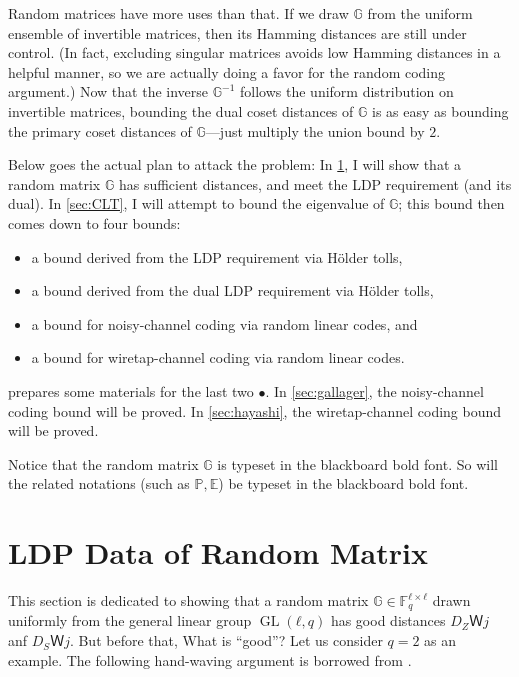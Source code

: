 \documentclass[openany]{amsbook}
\numberwithin{equation}{chapter}
\numberwithin{figure}{chapter}
\numberwithin{table}{chapter}
\DeclareMathOperator\GL{GL}
\theoremstyle{definition}	理dfn:Definition~?s			理exa:Example~?s
\theoremstyle{remark}		理cla:Claim~?s				理rem:Remark~?s
\begin{document}
	Random matrices have more uses than that.
	If we draw $𝔾$ from the uniform ensemble of invertible matrices,
	then its Hamming distances are still under control.
	(In fact, excluding singular matrices avoids low Hamming distances
	in a helpful manner, so we are actually doing a favor
	for the random coding argument.)
	Now that the inverse $𝔾^{-1}$ follows the uniform distribution on
	invertible matrices, bounding the dual coset distances of $𝔾$ is as easy as
	bounding the primary coset distances of $𝔾$---just multiply the union bound by $2$.
	
	Below goes the actual plan to attack the problem:
	In \cref{sec:LDP}, I will show that a random matrix $𝔾$ has sufficient distances,
	and meet the LDP requirement (and its dual).
	In \cref{sec:CLT}, I will attempt to bound the eigenvalue of $𝔾$;
	this bound then comes down to four bounds:
	\begin{itemize}
		\item	a bound derived from the LDP requirement via Hölder tolls,
		\item	a bound derived from the dual LDP requirement via Hölder tolls,
		\item	a bound for noisy-channel coding via random linear codes, and
		\item	a bound for wiretap-channel coding via random linear codes.
	\end{itemize}
	 prepares some materials for the last two $•$.
	In \cref{sec:gallager}, the noisy-channel coding bound will be proved.
	In \cref{sec:hayashi}, the wiretap-channel coding bound will be proved.
	
	Notice that the random matrix $𝔾$ is typeset in the blackboard bold font.
	So will the related notations (such as $ℙ,𝔼$)
	be typeset in the blackboard bold font.

\section{LDP Data of Random Matrix}\label{sec:LDP}

	This section is dedicated to showing that a random matrix $𝔾∈𝔽_q^{ℓ×ℓ}$
	drawn uniformly from the general linear group $\GL(ℓ,q)$
	has good distances $D_ZＷj$ anf $D_SＷj$.
	But before that, What is “good”?
	Let us consider $q=2$ as an example.
	The following hand-waving argument is borrowed from \cite{BF02}.
	
\end{document}
